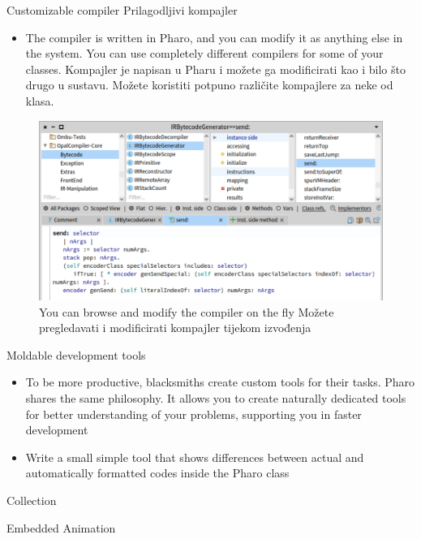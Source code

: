 \documentclass{beamer}
\begin{document}
\begin{frame}{Customizable compiler Prilagodljivi kompajler}
\begin{itemize}
    \item The compiler is written in Pharo, and you can modify it as anything else in the system. You can use completely different compilers for some of your classes.
    Kompajler je napisan u Pharu i možete ga modificirati kao i bilo što drugo u sustavu. Možete koristiti potpuno različite kompajlere za neke od klasa. 
\end{itemize}
\begin{figure}
    \centering
    \includegraphics[width=0.5\linewidth]{opal.png}
    \caption{You can browse and modify the compiler on the fly
Možete pregledavati i modificirati kompajler tijekom izvođenja}
    \label{fig:opal}
\end{figure}
\end{frame}

\begin{frame}{Moldable development tools}
\begin{itemize}
    \item To be more productive, blacksmiths create custom tools for their tasks. Pharo shares the same philosophy. It allows you to create naturally dedicated tools for better understanding of your problems, supporting you in faster development
    \item Write a small simple tool that shows differences between actual and automatically formatted codes inside the Pharo class
\end{itemize}
\begin{block}{}
 Collection
\end{block}
\end{frame}
\begin{frame}{Embedded Animation}
\end{frame}
\end{document}
